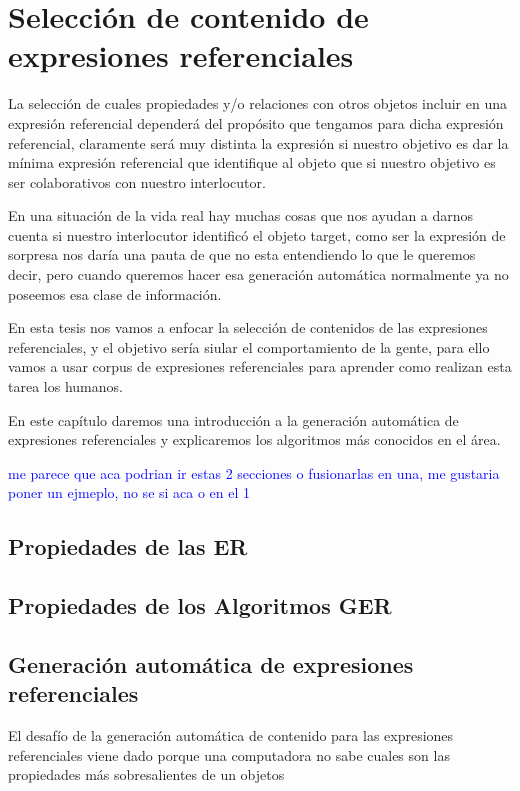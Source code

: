 \chapter{Selecci\'on de contenido de expresiones referenciales}
\label{sec:seleccion}

La selecci\'on de cuales propiedades y/o relaciones con otros objetos incluir en una expresi\'on referencial depender\'a del prop\'osito que tengamos para dicha expresi\'on referencial, claramente ser\'a muy distinta la expresi\'on si nuestro objetivo es dar la m\'inima expresi\'on referencial que identifique al objeto que si nuestro objetivo es ser colaborativos con nuestro interlocutor.

En una situaci\'on de la vida real hay muchas cosas que nos ayudan a darnos cuenta si nuestro interlocutor identific\'o el objeto target, como ser la expresi\'on de sorpresa nos dar\'ia una pauta de que no esta entendiendo lo que le queremos decir, pero cuando queremos hacer esa generaci\'on autom\'atica normalmente ya no poseemos esa clase de informaci\'on.

En esta tesis nos vamos a enfocar la selecci\'on de contenidos de las expresiones referenciales, y el objetivo ser\'ia siular el comportamiento de la gente, para ello vamos a usar corpus de expresiones referenciales para aprender como realizan esta tarea los humanos.

En este cap\'itulo daremos una introducci\'on a la generaci\'on autom\'atica de expresiones referenciales y explicaremos los algoritmos m\'as conocidos en el \'area.


\textcolor{blue}{me parece que aca podrian ir estas 2 secciones o fusionarlas en una, me gustaria poner un ejmeplo, no se si aca o en el 1}

\section{Propiedades de las ER}

\section{Propiedades de los Algoritmos GER}


\section{Generaci\'on autom\'atica de expresiones referenciales}

El desaf\'io de la generaci\'on autom\'atica de contenido para las expresiones referenciales viene dado porque una computadora no sabe cuales son las propiedades m\'as sobresalientes de un objetos


